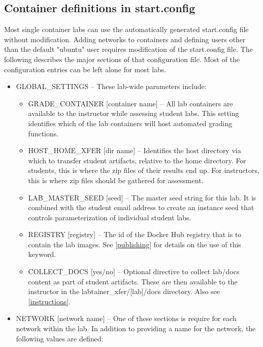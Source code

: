 \documentclass[12pt]{article}
\begin{document}
\subsection{Container definitions in start.config}
\label{start config}
Most single container labs can use the automatically generated start.config file
without modification.  Adding networks to containers and defining users other than the
default "ubuntu" user requires modification of the start.config file.
The following describes the major sections of that configuration file.  Most of the configuration
entries can be left alone for most labs.
\begin{itemize}
\item GLOBAL\_SETTINGS -- These lab-wide parameters include:

\begin{itemize}
\item GRADE\_CONTAINER [container name] -- All lab containers are available to the instructor while assessing student labs.
This setting identifies which of the lab containers will host automated grading functions.
\item HOST\_HOME\_XFER [dir name] --  Identifies the host directory via which to transfer student artifacts, relative to 
the home directory.  For students, this is where the zip files of their results end up.  For instructors, this is
where zip files should be gathered for assessment.
\item LAB\_MASTER\_SEED [seed] -- The master seed string for this lab.  It is combined with the student email
address to create an instance seed that controls parameterization of individual student labs.
\item REGISTRY [registry] -- The id of the Docker Hub registry that is to contain the lab images.
See \ref{publishing} for details on the use of this keyword.
\item COLLECT\_DOCS [yes/no] -- Optional directive to collect lab/docs content as part of student artifacts.
These are then available to the instructor in the labtainer\_xfer/[lab]/docs directory.  Also see \ref{instructions}.
\end{itemize}

\item NETWORK [network name] -- One of these sections is require for each network within the lab.  In addition to
providing a name for the network, the following values are defined:


\end{itemize}
\end{document}
